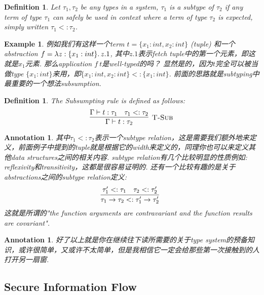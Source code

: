 \documentclass{article}
\newtheorem{example}[theorem]{Example}
\newtheorem{definition}[theorem]{Definition}
\newtheorem{annotation}[theorem]{Annotation}
\newcommand{\lam}[2]{\ensuremath{\lambda #1\ldotp #2}} %
\newcommand{\termtype}[2]{\ensuremath{#1:#2}}
\begin{document}
\begin{definition}
\rm Let $\tau_1,\tau_2$ be any types in a system, $\tau_1$ is a \emph{subtype} of $\tau_2$ if any term of type $\tau_1$ can safely be used in context where a term of type $\tau_2$ is expected, simply written $\tau_1 <: \tau_2$.
\end{definition}

\begin{example}
\rm 例如我们有这样一个term $t = \{x_1:int, x_2:int\}$ (tuple) 和一个abstraction $f = \lam{z:\{x_1:int\}}{z.1}$, 其中$z.1$表示fetch tuple中的第一个元素，即这就是$x_1$元素. 那么application $f~t$是well-typed的吗？ 显然是的，因为$t$完全可以被当做type $\{x_1:int\}$来用，即$\{x_1:int, x_2:int\} <: \{x_1:int\}$. 前面的思路就是subtyping中最重要的一个想法\emph{subsumption}.
\end{example}

\begin{definition}
\rm The Subsumpting rule is defined as follows:
\[
	\infer[\textsc{T-Sub}]{\Gamma \vdash \termtype{t}{\tau_2}}{\Gamma \vdash \termtype{t}{\tau_1} & \tau_1 <: \tau_2}
\]
\end{definition}

\begin{annotation}
\rm 其中$\tau_1 <: \tau_2$表示一个subtype relation，这是需要我们额外地来定义，前面例子中提到的tuple就是根据它的width来定义的，同理你也可以来定义其他data structures之间的相关内容. subtype relation有几个比较明显的性质例如: reflexivity和transitivity，这都是很容易证明的. 还有一个比较有趣的是关于abstractions之间的subtype relation定义:
\[
	\infer[]{\tau_1 \to \tau_2 <: \tau_1' \to \tau_2'}{\tau_1' <: \tau_1 & \tau_2 <: \tau_2'}
\]
这就是所谓的"the function arguments are contravariant and the function results are covariant".
\end{annotation}

\begin{annotation}
\rm 好了以上就是你在继续往下读所需要的关于type system的预备知识，或许很简单，又或许不太简单，但是我相信它一定会给那些第一次接触到的人打开另一扇窗. 
\end{annotation}

\subsection{Secure Information Flow}
\end{document}
